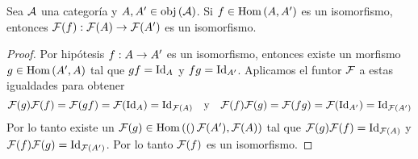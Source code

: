 \begin{ejercicio}\label{ej:68}
  Sea $\mathcal{A}$ una categor\'ia y $A,A'\in\text{obj}\left( \mathcal{A} \right)$. Si $f\in\text{Hom}\left( A,A' \right)$ es un isomorfismo,
  entonces $\mathcal{F}(f):\mathcal{F}(A)\rightarrow\mathcal{F}(A')$ es un isomorfismo.
\end{ejercicio}
\begin{proof}%
  Por hip\'otesis $f:A\rightarrow A'$ es un isomorfismo, entonces existe un morfismo
  $g\in\text{Hom}\left( A',A \right)$ tal que $gf=\text{Id}_A$ y $fg=\text{Id}_{A'}$. Aplicamos el funtor $\mathcal{F}$ a estas igualdades
  para obtener
  \[
    \mathcal{F}(g)\mathcal{F}(f)=\mathcal{F}(gf)=\mathcal{F}(\text{Id}_A)=\text{Id}_{\mathcal{F}(A)} \quad\text{y}\quad
    \mathcal{F}(f)\mathcal{F}(g)=\mathcal{F}(fg)=\mathcal{F}(\text{Id}_{A'})=\text{Id}_{\mathcal{F}(A')}
  \]
  Por lo tanto existe un $\mathcal{F}(g)\in\text{Hom}\left( ( \right)\mathcal{F}(A'),\mathcal{F}(A))$ tal que $\mathcal{F}(g)\mathcal{F}(f)=\text{Id}_{\mathcal{F}(A)}$
  y $\mathcal{F}(f)\mathcal{F}(g)=\text{Id}_{\mathcal{F}(A')}$. Por lo tanto $\mathcal{F}(f)$ es un isomorfismo.
\end{proof}%

